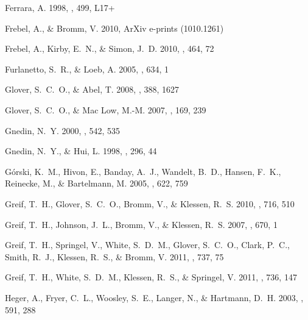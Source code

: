 \documentclass[12pt,preprint]{aastex}
\begin{document}
\begin{thebibliography}{108}
{Ferrara}, A. 1998, \apjl, 499, L17+

{Frebel}, A., \& {Bromm}, V. 2010, ArXiv e-prints (1010.1261)

{Frebel}, A., {Kirby}, E.~N., \& {Simon}, J.~D. 2010, \nat, 464, 72

{Furlanetto}, S.~R., \& {Loeb}, A. 2005, \apj, 634, 1

{Glover}, S.~C.~O., \& {Abel}, T. 2008, \mnras, 388, 1627

{Glover}, S.~C.~O., \& {Mac Low}, M.-M. 2007, \apjs, 169, 239

{Gnedin}, N.~Y. 2000, \apj, 542, 535

{Gnedin}, N.~Y., \& {Hui}, L. 1998, \mnras, 296, 44

{G{\'o}rski}, K.~M., {Hivon}, E., {Banday}, A.~J., {Wandelt}, B.~D., {Hansen},
  F.~K., {Reinecke}, M., \& {Bartelmann}, M. 2005, \apj, 622, 759

{Greif}, T.~H., {Glover}, S.~C.~O., {Bromm}, V., \& {Klessen}, R.~S. 2010,
  \apj, 716, 510

{Greif}, T.~H., {Johnson}, J.~L., {Bromm}, V., \& {Klessen}, R.~S. 2007, \apj,
  670, 1

{Greif}, T.~H., {Springel}, V., {White}, S.~D.~M., {Glover}, S.~C.~O., {Clark},
  P.~C., {Smith}, R.~J., {Klessen}, R.~S., \& {Bromm}, V. 2011{},
  \apj, 737, 75

{Greif}, T.~H., {White}, S.~D.~M., {Klessen}, R.~S., \& {Springel}, V.
  2011{}, \apj, 736, 147

{Heger}, A., {Fryer}, C.~L., {Woosley}, S.~E., {Langer}, N., \& {Hartmann},
  D.~H. 2003, \apj, 591, 288


\end{thebibliography}
\end{document}
